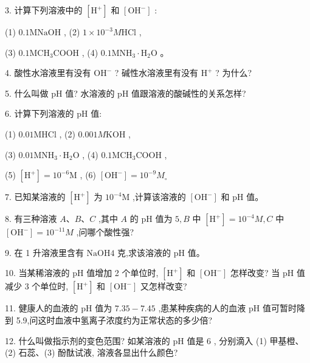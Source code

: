 \documentclass[10pt]{article}
\begin{document}
3. 计算下列溶液中的 \(\left\lbrack {\mathrm{H}}^{ + }\right\rbrack\) 和 \(\left\lbrack {\mathrm{{OH}}}^{ - }\right\rbrack\) :

(1) \({0.1}\mathrm{{MNaOH}}\) , (2) \(1 \times {10}^{-3}M\mathrm{{HCl}}\) ,

(3) \({0.1}{\mathrm{{MCH}}}_{3}\mathrm{{COOH}}\) , (4) \({0.1}{\mathrm{{MNH}}}_{3} \cdot {\mathrm{H}}_{2}\mathrm{O}\) 。

4. 酸性水溶液里有没有 \({\mathrm{{OH}}}^{ - }\) ? 碱性水溶液里有没有 \({\mathrm{H}}^{ + }\) ? 为什么?

5. 什么叫做 \(\mathrm{{pH}}\) 值? 水溶液的 \(\mathrm{{pH}}\) 值跟溶液的酸碱性的关系怎样?

6. 计算下列溶液的 \(\mathrm{{pH}}\) 值:

(1) \({0.01}\mathrm{{MHCl}}\) , (2) \({0.001M}\mathrm{{KOH}}\) ,

(3) \({0.01}{\mathrm{{MNH}}}_{3} \cdot {\mathrm{H}}_{2}\mathrm{O}\) , (4) \({0.1}{\mathrm{{MCH}}}_{3}\mathrm{{COOH}}\) ,

(5) \(\left\lbrack {\mathrm{H}}^{ + }\right\rbrack = {10}^{-6}\mathrm{M}\) , (6) \(\left\lbrack {\mathrm{{OH}}}^{ - }\right\rbrack = {10}^{-9}{M}_{ \circ }\)

7. 已知某溶液的 \(\left\lbrack {\mathrm{H}}^{ + }\right\rbrack\) 为 \({10}^{-4}\mathrm{M}\) ,计算该溶液的 \(\left\lbrack {\mathrm{{OH}}}^{ - }\right\rbrack\) 和 \(\mathrm{{pH}}\) 值。

8. 有三种溶液 \(A\text{、}B\text{、}C\) ,其中 \(A\) 的 \(\mathrm{{pH}}\) 值为 \(5,B\) 中 \(\left\lbrack {\mathrm{H}}^{ + }\right\rbrack = {10}^{-4}M,C\) 中 \(\left\lbrack {\mathrm{{OH}}}^{ - }\right\rbrack = {10}^{-{11}}M\) ,问哪个酸性强?

9. 在 1 升溶液里含有 \(\mathrm{{NaOH}}4\) 克,求该溶液的 \(\mathrm{{pH}}\) 值。

10. 当某稀溶液的 \(\mathrm{{pH}}\) 值增加 2 个单位时, \(\left\lbrack {\mathrm{H}}^{ + }\right\rbrack\) 和 \(\left\lbrack {\mathrm{{OH}}}^{ - }\right\rbrack\) 怎样改变? 当 \(\mathrm{{pH}}\) 值减少 3 个单位时, \(\left\lbrack {\mathrm{H}}^{ + }\right\rbrack\) 和 \(\left\lbrack {\mathrm{{OH}}}^{ - }\right\rbrack\) 又怎样改变?

11. 健康人的血液的 \(\mathrm{{pH}}\) 值为 \({7.35} - {7.45}\) ,患某种疾病的人的血液 \(\mathrm{{pH}}\) 值可暂时降到 5.9,问这时血液中氢离子浓度约为正常状态的多少倍?

12. 什么叫做指示剂的变色范围? 如某溶液的 \(\mathrm{{pH}}\) 值是 6 , 分别滴入 (1) 甲基橙、(2) 石蕊、(3) 酚酞试液, 溶液各显出什么颜色?
\end{document}
